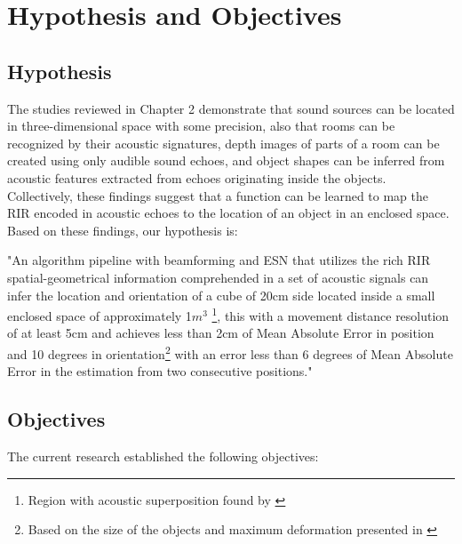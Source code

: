 \chapter{Hypothesis and Objectives}
\label{chapter:hypothesis-objectives}


\section{Hypothesis}
\label{section:hypothesis}

The studies reviewed in Chapter 2 demonstrate that sound sources can be located in three-dimensional space with some precision, also that rooms can be recognized by their acoustic signatures, depth images of parts of a room can be created using only audible sound echoes, and object shapes can be inferred from acoustic features extracted from echoes originating inside the objects. Collectively, these findings suggest that a function can be learned to map the RIR encoded in acoustic echoes to the location of an object in an enclosed space. Based on these findings, our hypothesis is:

"An algorithm pipeline with beamforming and ESN that utilizes the rich RIR spatial-geometrical information comprehended in a set of acoustic signals can infer the location and orientation of a cube of 20cm side located inside a small enclosed space of approximately 1\(m^3\) \footnote{Region with acoustic superposition found by \cite{bat1}}, this with a movement distance resolution of at least 5cm and achieves less than 2cm of Mean Absolute Error in position and 10 degrees in orientation\footnote{Based on the size of the objects and maximum deformation presented in \cite{echosense}} with an error less than 6 degrees of Mean Absolute Error in the estimation from two consecutive positions."




\section{Objectives}
\label{section:objectives}
The current research established the following objectives:

